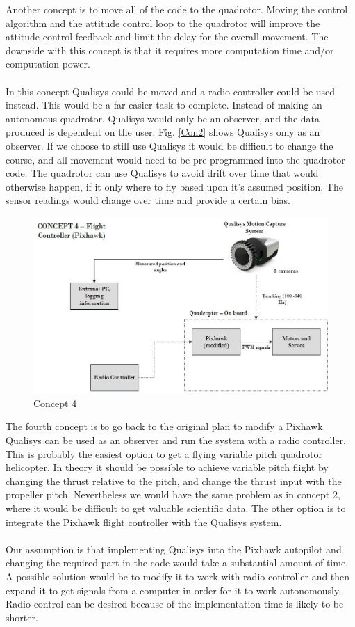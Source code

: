 \noindent
Another concept is to move all of the code to the quadrotor. Moving the control algorithm and the attitude control loop to the quadrotor will improve the attitude control feedback and limit the delay for the overall movement. The downside with this concept is that it requires more computation time and/or computation-power. 
\\\\
In this concept Qualisys could be moved and a radio controller could be used instead. This would be a far easier task to complete. Instead of making an autonomous quadrotor. Qualisys would only be an observer, and the data produced is dependent on the user. Fig. \ref{Con2} shows Qualisys only as an observer. If we choose to still use Qualisys it would be difficult to change the course, and all movement would need to be pre-programmed into the quadrotor code. The quadrotor can use Qualisys to avoid drift over time that would otherwise happen, if it only where to fly based upon it's assumed position. The sensor readings would change over time and provide a certain bias. 

\begin{figure}[H]
          \centering
            \includegraphics[scale = 0.67]{VAPIQ-PICTURES/Concept4.jpg}
                \caption{Concept 4}
                \label{Con3}
            \label{dir}
\end{figure} 

\noindent The fourth concept is to go back to the original plan to modify a Pixhawk. Qualisys can be used as an observer and run the system with a radio controller. This is probably the easiest option to get a flying variable pitch quadrotor helicopter. In theory it should be possible to achieve variable pitch flight by changing the thrust relative to the pitch, and change the thrust input with the propeller pitch. Nevertheless we would have the same problem as in concept 2, where it would be difficult to get valuable scientific data. The other option is to integrate the Pixhawk flight controller with the Qualisys system. 
\\\\
Our assumption is that implementing Qualisys into the Pixhawk autopilot and changing the required part in the code would take a substantial amount of time. A possible solution would be to modify it to work with radio controller and then expand it to get signals from a computer in order for it to work autonomously. Radio control can be desired because of the implementation time is likely to be shorter.

